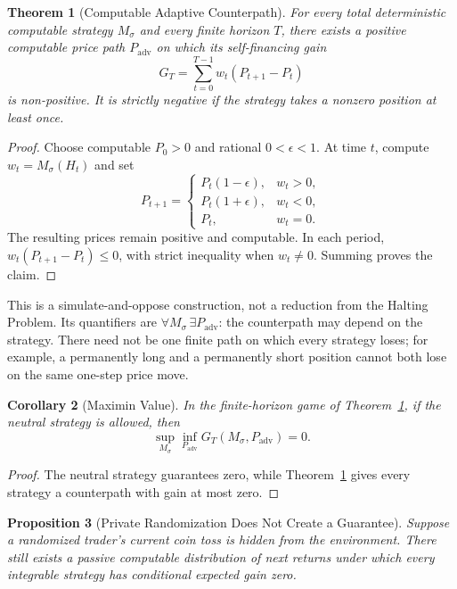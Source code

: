 \documentclass[aps,pra,reprint,superscriptaddress,amsmath,amssymb,floatfix]{revtex4-2}
\theoremstyle{plain}
\newtheorem{theorem}{Theorem}
\newtheorem{corollary}[theorem]{Corollary}
\newtheorem{proposition}[theorem]{Proposition}
\theoremstyle{definition}
\theoremstyle{remark}
\begin{document}
\begin{theorem}[Computable Adaptive Counterpath]
  \label{thm:counterpath}
  For every total deterministic computable strategy \(M_\sigma\) and every
  finite horizon \(T\), there exists a positive computable price path
  \(P_{\mathrm{adv}}\) on which its self-financing gain
  \[
    G_T=\sum_{t=0}^{T-1}w_t(P_{t+1}-P_t)
  \]
  is non-positive. It is strictly negative if the strategy takes a nonzero
  position at least once.
\end{theorem}

\begin{proof}
Choose computable \(P_0>0\) and rational \(0<\epsilon<1\). At time \(t\),
compute \(w_t=M_\sigma(H_t)\) and set
\begin{equation}
P_{t+1}=
\begin{cases}
P_t(1-\epsilon),&w_t>0,\\
P_t(1+\epsilon),&w_t<0,\\
P_t,&w_t=0.
\end{cases}
\label{eq:adversary}
\end{equation}
The resulting prices remain positive and computable. In each period,
\(w_t(P_{t+1}-P_t)\leq0\), with strict inequality when \(w_t\neq0\).
Summing proves the claim.
\end{proof}

This is a simulate-and-oppose construction, not a reduction from the Halting
Problem. Its quantifiers are
\(\forall M_\sigma\,\exists P_{\mathrm{adv}}\): the counterpath may depend on
the strategy. There need not be one finite path on which every strategy loses;
for example, a permanently long and a permanently short position cannot both
lose on the same one-step price move.

\begin{corollary}[Maximin Value]
  \label{cor:maximin}
  In the finite-horizon game of Theorem~\ref{thm:counterpath}, if the neutral
  strategy is allowed, then
  \[
    \sup_{M_\sigma}\inf_{P_{\mathrm{adv}}}G_T(M_\sigma,P_{\mathrm{adv}})=0.
  \]
\end{corollary}

\begin{proof}
The neutral strategy guarantees zero, while
Theorem~\ref{thm:counterpath} gives every strategy a counterpath with gain at
most zero.
\end{proof}

\begin{proposition}[Private Randomization Does Not Create a Guarantee]
  \label{prop:randomized}
  Suppose a randomized trader's current coin toss is hidden from the
  environment. There still exists a passive computable distribution of next
  returns under which every integrable strategy has conditional expected gain
  zero.
\end{proposition}
\end{document}
